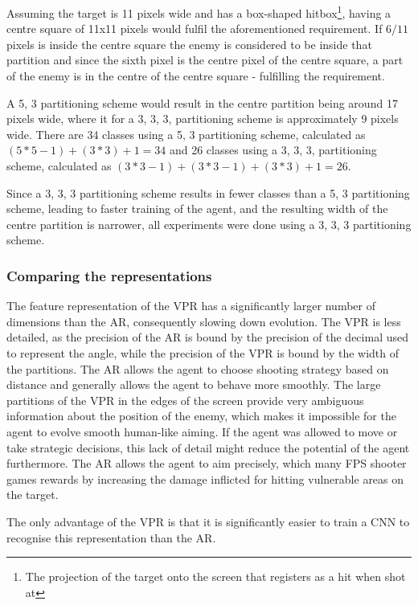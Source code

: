 Assuming the target is 11 pixels wide and has a box-shaped hitbox\footnote{The projection of the target onto the screen that registers as a hit when shot at}, having a centre square of 11x11 pixels would fulfil the aforementioned requirement. If $6/11$ pixels is inside the centre square the enemy is considered to be inside that partition and since the sixth pixel is the centre pixel of the centre square, a part of the enemy is in the centre of the centre square - fulfilling the requirement.

A 5, 3 partitioning scheme would result in the centre partition being around 17 pixels wide, where it for a 3, 3, 3, partitioning scheme is approximately 9 pixels wide. There are 34 classes using a 5, 3 partitioning scheme, calculated as $(5*5-1)+(3*3)+1=34$ and 26 classes using a 3, 3, 3, partitioning scheme, calculated as $(3*3-1)+(3*3-1)+(3*3)+1=26$.

Since a 3, 3, 3 partitioning scheme results in fewer classes than a 5, 3 partitioning scheme, leading to faster training of the agent, and the resulting width of the centre partition is narrower, all experiments were done using a 3, 3, 3 partitioning scheme.




\subsubsection{Comparing the representations}
The feature representation of the VPR has a significantly larger number of dimensions than the AR, consequently slowing down evolution. The VPR is less detailed, as the precision of the AR is bound by the precision of the decimal used to represent the angle, while the precision of the VPR is bound by the width of the partitions. The AR allows the agent to choose shooting strategy based on distance and generally allows the agent to behave more smoothly. The large partitions of the VPR in the edges of the screen provide very ambiguous information about the position of the enemy, which makes it impossible for the agent to evolve smooth human-like aiming. If the agent was allowed to move or take strategic decisions, this lack of detail might reduce the potential of the agent furthermore. The AR allows the agent to aim precisely, which many FPS shooter games rewards by increasing the damage inflicted for hitting vulnerable areas on the target.

The only advantage of the VPR is that it is significantly easier to train a CNN to recognise this representation than the AR.

